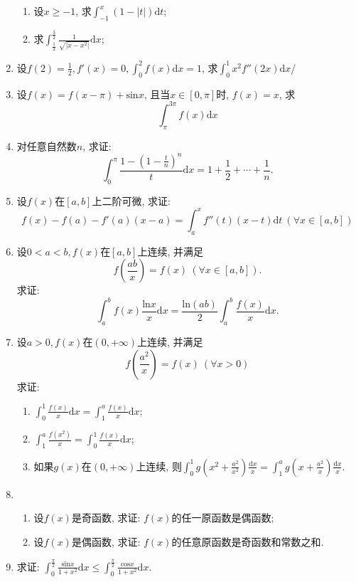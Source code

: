 \begin{enumerate}
\begin{enumerate}
	\item 设$x\ge -1$, 求$\displaystyle{\int_{-1}^{x}(1-|t|)\mathrm{d}t}$;
	\item 求$\displaystyle{\int_{\frac{1}{2}}^{\frac{3}{2}}\frac{1}{\sqrt{|x-x^2|}}\mathrm{d}x}$;
\end{enumerate}
\item 设$f(2)=\frac{1}{2},f'(x)=0,\displaystyle{\int_{0}^{2}f(x)\mathrm{d}x=1}$, 求$\displaystyle{\int_{0}^{1}x^2f''(2x)\mathrm{d}x}$/
\item 设$f(x)=f(x-\pi)+\mathrm{sin}x$, 且当$x\in [0,\pi]$时, $f(x)=x$, 求
$$\displaystyle{\int_{\pi}^{3\pi}f(x)\mathrm{d}x}$$
\item 对任意自然数$n$, 求证:
$$\displaystyle{\int_{0}^{\pi}\frac{1-(1-\frac{t}{n})^n}{t}\mathrm{d}x=1+\frac{1}{2}+\cdots+\frac{1}{n}}.$$
\item 设$f(x)$在$[a,b]$上二阶可微, 求证:
$$
f(x)-f(a)-f'(a)(x-a) = \displaystyle{\int_{a}^{x}f''(t)(x-t)\mathrm{d}t}\ (\forall x\in [a,b])
$$
\item 设$0<a<b,f(x)$在$[a,b]$上连续, 并满足$$
f(\frac{ab}{x}) = f(x)\ (\forall x\in[a,b]).$$
求证: $$
\displaystyle{\int_{a}^{b}f(x)\frac{\mathrm{ln}x}{x}\mathrm{d}x=\frac{\mathrm{ln}(ab)}{2}\int_{a}^{b}\frac{f(x)}{x}\mathrm{d}x}.$$
\item 设$a>0,f(x)$在$(0,+\infty)$上连续, 并满足$$
f(\frac{a^2}{x})=f(x)\ (\forall x>0 )$$
求证:
\begin{enumerate}
	\item $\displaystyle{\int_{0}^{1}\frac{f(x)}{x}\mathrm{d}x=\int_{1}^{a}\frac{f(x)}{x}\mathrm{d}x}$;
	\item $\displaystyle{\int_{1}^{a}\frac{f(x^2)}{x}=\int_{0}^{1}\frac{f(x)}{x}\mathrm{d}x}$;
	\item 如果$g(x)$在$(0,+\infty)$上连续, 则$\displaystyle{\int_{0}^{1}g(x^2+\frac{a^2}{x^2})\frac{\mathrm{d}x}{x}=\int_{1}^{a}g(x+\frac{a^2}{x})\frac{\mathrm{d}x}{x}}$.
\end{enumerate}
\item 
\begin{enumerate}
	\item 设$f(x)$是奇函数, 求证: $f(x)$的任一原函数是偶函数;
	\item 设$f(x)$是偶函数, 求证: $f(x)$的任意原函数是奇函数和常数之和.
\end{enumerate}
\item 求证: $\displaystyle{\int_{0}^{\frac{\pi}{2}}\frac{\mathrm{sin}x}{1+x^2}\mathrm{d}x\le \int_{0}^{\frac{\pi}{2}}\frac{\mathrm{cos}x}{1+x^2}\mathrm{d}x}$.

\end{enumerate}
